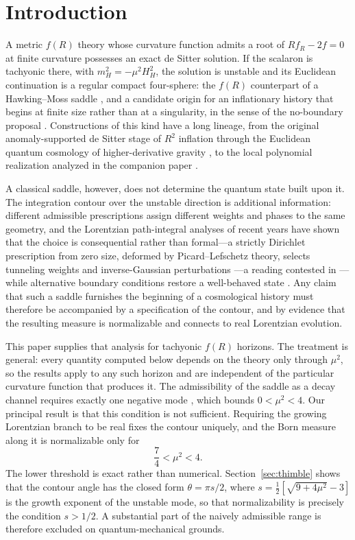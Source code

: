 \documentclass[aps,prd,twocolumn,superscriptaddress,nofootinbib,longbibliography]{revtex4-2}
\begin{document}
\section{Introduction}
\label{sec:intro}
A metric $f(R)$ theory whose curvature function admits a root of
$Rf_R-2f=0$ at finite curvature possesses an exact de Sitter solution. If the
scalaron is tachyonic there, with $m_H^2=-\mu^2H_H^2$, the solution is
unstable and its Euclidean continuation is a regular compact four-sphere: the
$f(R)$ counterpart of a Hawking--Moss saddle \cite{HawkingMoss1982}, and a
candidate origin for an inflationary history that begins at finite size
rather than at a singularity, in the sense of the no-boundary proposal
\cite{HartleHawking1983}. Constructions of this kind have a long lineage,
from the original anomaly-supported de Sitter stage of $R^2$ inflation
\cite{Starobinsky1980,Vilenkin1985} through the Euclidean quantum cosmology
of higher-derivative gravity \cite{HawkingLuttrell1984}, to the local
polynomial realization analyzed in the companion paper \cite{PandevI}.

A classical saddle, however, does not determine the quantum state built upon
it. The integration contour over the unstable direction is additional
information: different admissible prescriptions assign different weights and
phases to the same geometry, and the Lorentzian path-integral analyses of
recent years have shown that the choice is consequential rather than
formal---a strictly Dirichlet prescription from zero size, deformed by
Picard--Lefschetz theory, selects tunneling weights and inverse-Gaussian
perturbations \cite{FLT2017,FLT2017b}---a reading contested in
\cite{DDHHJ2017}---while alternative boundary conditions restore a
well-behaved state \cite{DiTucciLehners2019,DiTucci2019,Lehners2023}. Any claim that
such a saddle furnishes the beginning of a cosmological history must
therefore be accompanied by a specification of the contour, and by evidence
that the resulting measure is normalizable and connects to real Lorentzian
evolution.

This paper supplies that analysis for tachyonic $f(R)$ horizons. The
treatment is general: every quantity computed below depends on the theory
only through $\mu^2$, so the results apply to any such horizon and are
independent of the particular curvature function that produces it. The
admissibility of the saddle as a decay channel requires exactly one negative
mode \cite{Coleman1988,ColemanDeLuccia1980}, which bounds $0<\mu^2<4$.
Our principal
result is that this condition
is not sufficient. Requiring the growing Lorentzian branch to be real fixes
the contour uniquely, and the Born measure along it is normalizable only for
\begin{equation}
\frac{7}{4}<\mu^2<4 .
\label{eq:window}
\end{equation}
The lower threshold is exact rather than numerical. Section~\ref{sec:thimble}
shows that the contour angle has the closed form $\theta=\pi s/2$, where
$s=\tfrac12[\sqrt{9+4\mu^2}-3]$ is the growth exponent of the unstable mode,
so that normalizability is precisely the condition $s>1/2$. A substantial
part of the naively admissible range is therefore excluded on
quantum-mechanical grounds.
\end{document}
